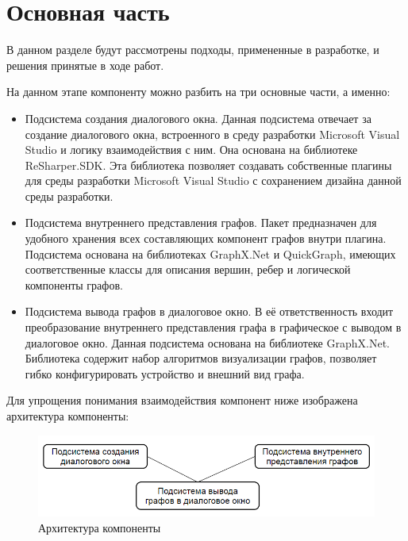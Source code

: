 \documentclass{matmex-diploma}
\begin{document}
\newpage
\section{Основная часть}

В данном разделе будут рассмотрены подходы, примененные в разработке, и решения принятые в ходе работ.

На данном этапе компоненту можно разбить на три основные части, а именно:


\begin{itemize}

         \item { Подсистема создания диалогового окна. Данная подсистема отвечает за создание диалогового окна, встроенного в среду разработки Microsoft Visual Studio и логику взаимодействия с ним. Она основана на библиотеке ReSharper.SDK. Эта библиотека позволяет создавать собственные плагины для среды разработки Microsoft Visual Studio с сохранением дизайна данной среды разработки. }
        \item { Подсистема внутреннего представления графов. Пакет предназначен для удобного хранения всех составляющих компонент графов внутри плагина. Подсистема основана на библиотеках GraphX.Net и QuickGraph, имеющих соответственные классы для описания вершин, ребер и логической компоненты графов. }
       \item { Подсистема вывода графов в диалоговое окно. В её ответственность входит преобразование внутреннего представления графа в графическое с выводом в диалоговое окно. Данная подсистема основана на библиотеке GraphX.Net. Библиотека содержит набор алгоритмов визуализации графов, позволяет гибко конфигурировать устройство и внешний вид графа.
}
\end{itemize}
 
Для упрощения понимания взаимодействия компонент ниже изображена архитектура компоненты:
\newpage
\begin{figure}[t]
\label{Pack}
\centering
\includegraphics[width=\textwidth]{Packages.png}
\caption{Архитектура компоненты}
\end{figure}
\end{document}
